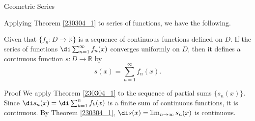 \begin{example}[label=230305_16]{Geometric Series}
\begin{example}[label=230304_9]{}
\begin{example}{}
 
\end{example}
Applying Theorem \ref{230304_1} to series of functions, we have the following.
\begin{corollary}[label=230305_10]{}
Given that $\{f_n:D\rightarrow \mathbb{R}\}$ is a sequence of continuous functions defined on $D$. If the series of functions $\di\sum_{n=1}^{\infty}f_n(x)$ converges uniformly on  $D$, then it defines a continuous function $s:D\to\mathbb{R}$ by
\[s(x)=\sum_{n=1}^{\infty}f_n(x).\]
\end{corollary}\begin{myproof}{Proof}
We apply  Theorem \ref{230304_1} to the sequence of partial sums $\{s_n(x)\}$. Since $\di s_n(x)=\di\sum_{k=1}^nf_k(x)$ is a finite sum of continuous functions, it is continuous. By Theorem \ref{230304_1}, $\di s(x)=\lim_{n\to\infty}s_n(x)$ is continuous.
\end{myproof}


\end{example}
\end{example}
